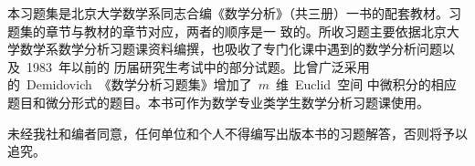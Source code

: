 

\begin{summary}
本习题集是北京大学数学系同志合编《数学分析》（共三册）一书的配套教材。习题集的章节与教材的章节对应，两者的顺序是一
致的。所收习题主要依据北京大学数学系数学分析习题课资料编撰，也吸收了专门化课中遇到的数学分析问题以及~1983~年以前的
历届研究生考试中的部分试题。比曾广泛采用的~Demidovich~《数学分析习题集》增加了~$m$~维~Euclid~空间
中微积分的相应题目和微分形式的题目。本书可作为数学专业类学生数学分析习题课使用。

未经我社和编者同意，任何单位和个人不得编写出版本书的习题解答，否则将予以追究。
\end{summary}

\MakeVolume

\volfrontmatter



\VolumeTOC

\endinput

